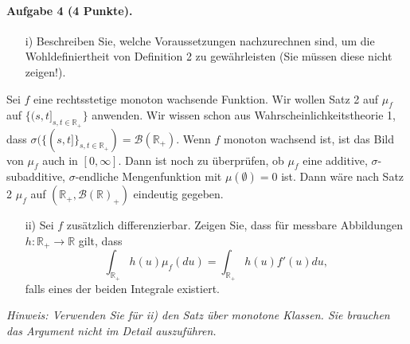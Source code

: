 \documentclass{article}
\begin{document}
\paragraph{Aufgabe 4 \textnormal{(4 Punkte)}.}
\begin{itemize}
\item [i)] Beschreiben Sie, welche Voraussetzungen nachzurechnen sind, um die Wohldefiniertheit von Definition 2 zu gewährleisten (Sie müssen diese nicht zeigen!).
\end{itemize}
Sei $f$ eine rechtsstetige monoton wachsende Funktion.
Wir wollen Satz 2 auf $\mu_f$ auf $\{(s,t]_{s,t\in\mathbb{R}_+}\}$ anwenden.
Wir wissen schon aus Wahrschein\-lich\-keits\-the\-o\-rie 1, dass $\sigma(\{(s,t]\}_{s,t\in\mathbb{R}_+})=\mathscr{B}(\mathbb{R}_+)$.
Wenn $f$ monoton wachsend ist, ist das Bild von $\mu_f$ auch in $[0,\infty]$.
Dann ist noch zu überprüfen, ob $\mu_f$ eine additive, $\sigma$-subadditive, $\sigma$-endliche Mengenfunktion mit  $\mu(\emptyset)=0$ ist.
Dann wäre nach Satz 2 $\mu_f$ auf $(\mathbb{R}_+,\mathscr{B}(\mathbb{R})_+)$ eindeutig gegeben.
\begin{itemize}
\item [ii)] Sei $f$ zusätzlich differenzierbar.
  Zeigen Sie, dass für messbare Ab\-bil\-dun\-gen $h\colon\mathbb{R}_+\to\mathbb{R}$ gilt, dass
  \[
    \int_{\mathbb{R}_+}h(u)\mu_f(du)=\int_{\mathbb{R}_+}h(u)f'(u)du,
  \]
  falls eines der beiden Integrale existiert.
\end{itemize}
\emph{Hinweis: Verwenden Sie für ii) den Satz über monotone Klassen.
  Sie brauchen das Argument nicht im Detail auszuführen.}
\end{document}
